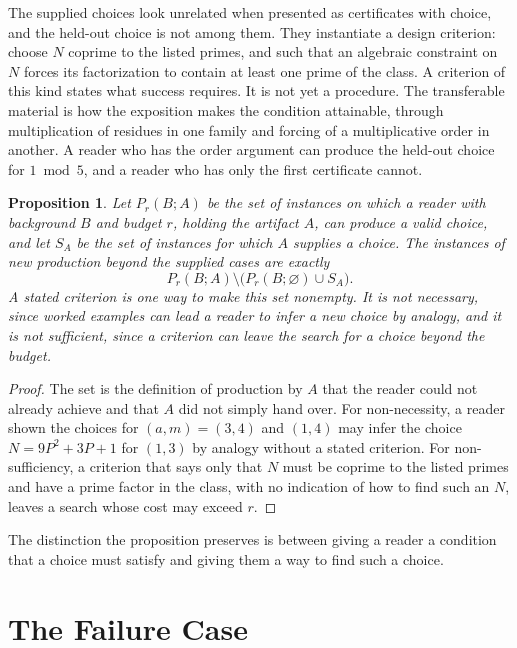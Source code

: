 \documentclass[11pt]{book}
\newtheorem{proposition}[theorem]{Proposition}
\theoremstyle{definition}
\theoremstyle{remark}
\begin{document}
The supplied choices look unrelated when presented as certificates with choice, and the held-out choice is not among them. They instantiate a design criterion: choose $N$ coprime to the listed primes, and such that an algebraic constraint on $N$ forces its factorization to contain at least one prime of the class. A criterion of this kind states what success requires. It is not yet a procedure. The transferable material is how the exposition makes the condition attainable, through multiplication of residues in one family and forcing of a multiplicative order in another. A reader who has the order argument can produce the held-out choice for $1\bmod5$, and a reader who has only the first certificate cannot.

\begin{proposition}\label{prop:relegation}
Let $P_r(B;A)$ be the set of instances on which a reader with background $B$ and budget $r$, holding the artifact $A$, can produce a valid choice, and let $S_A$ be the set of instances for which $A$ supplies a choice. The instances of new production beyond the supplied cases are exactly
\[
P_r(B;A)\setminus\bigl(P_r(B;\varnothing)\cup S_A\bigr).
\]
A stated criterion is one way to make this set nonempty. It is not necessary, since worked examples can lead a reader to infer a new choice by analogy, and it is not sufficient, since a criterion can leave the search for a choice beyond the budget.
\end{proposition}

\begin{proof}
The set is the definition of production by $A$ that the reader could not already achieve and that $A$ did not simply hand over. For non-necessity, a reader shown the choices for $(a,m)=(3,4)$ and $(1,4)$ may infer the choice $N=9P^2+3P+1$ for $(1,3)$ by analogy without a stated criterion. For non-sufficiency, a criterion that says only that $N$ must be coprime to the listed primes and have a prime factor in the class, with no indication of how to find such an $N$, leaves a search whose cost may exceed $r$.
\end{proof}

The distinction the proposition preserves is between giving a reader a condition that a choice must satisfy and giving them a way to find such a choice.

\section{The Failure Case}
\end{document}

